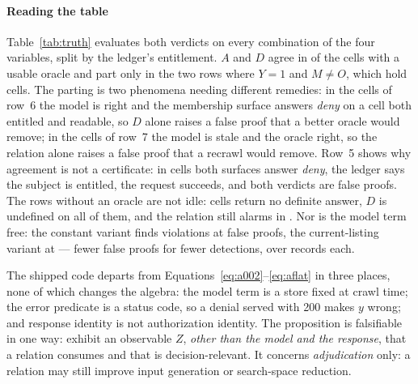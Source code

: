 \paragraph{Reading the table}
Table~\ref{tab:truth} evaluates both verdicts on every combination of the four variables,
split by the ledger's entitlement. $A$ and $D$ agree in \TvtAgree{} of the \TvtReadable{}
cells with a usable oracle and part only in the two rows where $Y=1$ and $M\ne O$, which
hold \TvtDisagree{} cells. The parting is two phenomena needing different remedies: in
the \TvtOracleWrong{} cells of row~6 the model is right and the membership surface answers
\emph{deny} on a cell both entitled and readable, so $D$ alone raises a false proof that a
better oracle would remove; in the \TvtModelWrong{} cells of row~7 the model is stale and
the oracle right, so the relation alone raises a false proof that a recrawl would remove.
Row~5 shows why agreement is not a certificate: in \TvtBothWrong{} cells both surfaces
answer \emph{deny}, the ledger says the subject is entitled, the request succeeds, and
both verdicts are false proofs. The rows without an oracle are not idle:
\TvtUnreadable{} cells return no definite answer, $D$ is undefined on all of them, and the
relation still alarms in \TvtUnreadAlarms{}. Nor is the model term free: the constant
variant finds \TvtBlindTP{} violations at \TvtBlindFP{} false proofs, the current-listing
variant \TvtConTP{} at \TvtConFP{}---\TvtModelSaveFP{} fewer false proofs for
\TvtModelCostTP{} fewer detections, over \TvtConAware{} records each.

The shipped code departs from Equations~\eqref{eq:a002}--\eqref{eq:aflat} in three
places, none of which changes the algebra: the model term is a store fixed at crawl time;
the error predicate is a status code, so a denial served with 200 makes $y$ wrong; and
response identity is not authorization identity. The proposition is falsifiable in one
way: exhibit an observable $Z$, \emph{other than the model and the response}, that a
relation consumes and that is decision-relevant. It concerns \emph{adjudication} only: a
relation may still improve input generation or search-space reduction.

